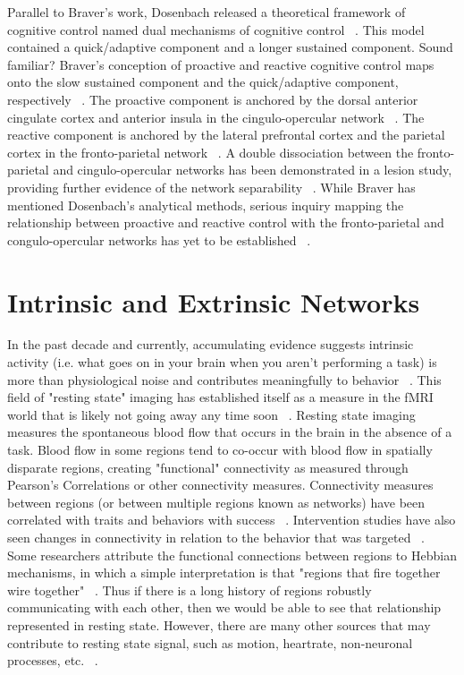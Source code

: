 \documentclass[phd,appendix,figures]{uithesis}
\begin{document}
Parallel to Braver's work, Dosenbach released a theoretical framework of cognitive control named dual mechanisms of cognitive control ~\citep{Dosenbach2007}. 
This model contained a quick/adaptive component and a longer sustained component.
Sound familiar?
Braver's conception of proactive and reactive cognitive control maps onto the slow sustained component and the quick/adaptive component, respectively ~\citep{Braver2012}.
The proactive component is anchored by the dorsal anterior cingulate cortex and anterior insula in the cingulo-opercular network ~\citep{Dosenbach2008}.
The reactive component is anchored by the lateral prefrontal cortex and the parietal cortex in the fronto-parietal network ~\citep{Dosenbach2008}.
A double dissociation between the fronto-parietal and cingulo-opercular networks has been demonstrated in a lesion study, providing further evidence of the network separability ~\citep{Nomura2010}.
While Braver has mentioned Dosenbach's analytical methods, serious inquiry mapping the relationship between proactive and reactive control with the fronto-parietal and congulo-opercular networks has yet to be established ~\citep{Braver2006,Cooper2015}.

\section{Intrinsic and Extrinsic Networks}

In the past decade and currently, accumulating evidence suggests intrinsic activity (i.e. what goes on in your brain when you aren't performing a task) is more than physiological noise and contributes meaningfully to behavior ~\citep{Busch2010,Kenet2003,McCormick1999,Mateo2017}.
This field of "resting state" imaging has established itself as a measure in the fMRI world that is likely not going away any time soon ~\citep{VandenHeuvel2010,Shen2015}.
Resting state imaging measures the spontaneous blood flow that occurs in the brain in the absence of a task.
Blood flow in some regions tend to co-occur with blood flow in spatially disparate regions, creating "functional" connectivity as measured through Pearson's Correlations or other connectivity measures.
Connectivity measures between regions (or between multiple regions known as networks) have been correlated with traits and behaviors with success ~\citep{Dennis2011,Duchek2013}.
Intervention studies have also seen changes in connectivity in relation to the behavior that was targeted ~\citep{Horowitz-Kraus2015}.
Some researchers attribute the functional connections between regions to Hebbian mechanisms, in which a simple interpretation is that "regions that fire together wire together" ~\citep{Harmelech2013}.
Thus if there is a long history of regions robustly communicating with each other, then we would be able to see that relationship represented in resting state.
However, there are many other sources that may contribute to resting state signal, such as motion, heartrate, non-neuronal processes, etc. ~\citep{Winder2017,Murphy2013}.
\end{document}
